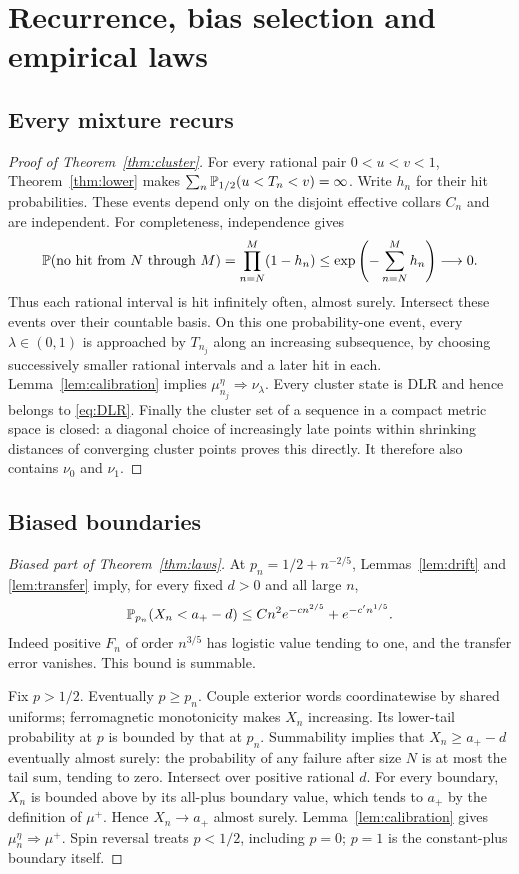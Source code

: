 \section{Recurrence, bias selection and empirical laws}\label{sec:laws}
\subsection{Every mixture recurs}
\begin{proof}[Proof of Theorem~\ref{thm:cluster}]
For every rational pair $0<u<v<1$, Theorem~\ref{thm:lower} makes
$\sum_n\mathbb P_{1/2}(u<T_n<v)=\infty$. Write $h_n$ for their hit probabilities. These events depend only on the disjoint effective collars $C_n$ and are independent. For completeness, independence gives
\[
 \mathbb P(\text{no hit from }N\text{ through }M)
 =\prod_{n=N}^M(1-h_n)\le\exp\left(-\sum_{n=N}^M h_n\right)\longrightarrow0.
\]
Thus each rational interval is hit infinitely often, almost surely. Intersect these events over their countable basis. On this one probability-one event, every $\lambda\in(0,1)$ is approached by $T_{n_j}$ along an increasing subsequence, by choosing successively smaller rational intervals and a later hit in each. Lemma~\ref{lem:calibration} implies $\mu_{n_j}^\eta\Rightarrow\nu_\lambda$. Every cluster state is DLR and hence belongs to \eqref{eq:DLR}. Finally the cluster set of a sequence in a compact metric space is closed: a diagonal choice of increasingly late points within shrinking distances of converging cluster points proves this directly. It therefore also contains $\nu_0$ and $\nu_1$.
\end{proof}

\subsection{Biased boundaries}
\begin{proof}[Biased part of Theorem~\ref{thm:laws}]
At $p_n=1/2+n^{-2/5}$, Lemmas~\ref{lem:drift} and \ref{lem:transfer} imply, for every fixed $d>0$ and all large $n$,
\[
 \mathbb P_{p_n}(X_n<a_+-d)
 \le Cn^2e^{-c n^{2/5}}+e^{-c'n^{1/5}}.
\]
Indeed positive $F_n$ of order $n^{3/5}$ has logistic value tending to one, and the transfer error vanishes. This bound is summable.

Fix $p>1/2$. Eventually $p\ge p_n$. Couple exterior words coordinatewise by shared uniforms; ferromagnetic monotonicity makes $X_n$ increasing. Its lower-tail probability at $p$ is bounded by that at $p_n$. Summability implies that $X_n\ge a_+-d$ eventually almost surely: the probability of any failure after size $N$ is at most the tail sum, tending to zero. Intersect over positive rational $d$. For every boundary, $X_n$ is bounded above by its all-plus boundary value, which tends to $a_+$ by the definition of $\mu^+$. Hence $X_n\to a_+$ almost surely. Lemma~\ref{lem:calibration} gives $\mu_n^\eta\Rightarrow\mu^+$. Spin reversal treats $p<1/2$, including $p=0$; $p=1$ is the constant-plus boundary itself.
\end{proof}

